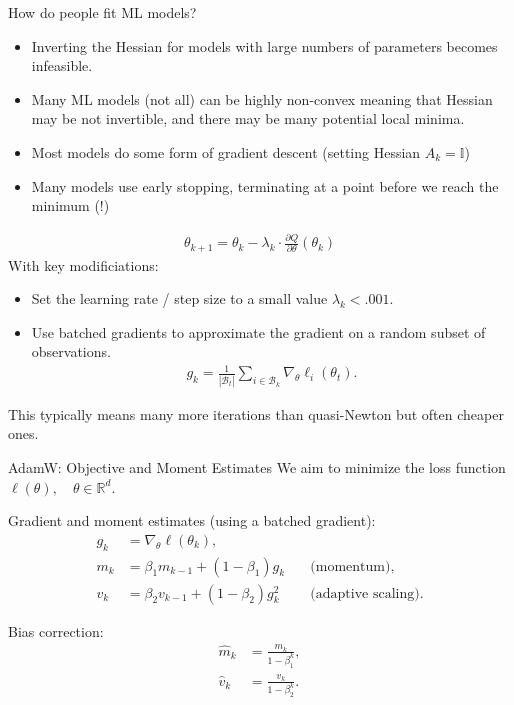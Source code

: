 \documentclass[aspectratio=169,11pt]{beamer}
\begin{document}
\begin{frame}{How do people fit ML models?}
\begin{itemize}
	\item Inverting the Hessian for models with large numbers of parameters becomes infeasible.
	\item Many ML models (not all) can be highly \alert{non-convex} meaning that Hessian may be not invertible, and there may be many potential \alert{local minima}.
	\item Most models do some form of \alert{gradient descent} (setting Hessian $A_k=\mathbb{I}$)
	\item Many models use \alert{early stopping}, terminating at a point before we reach the minimum (!)
\end{itemize}
\begin{align*}
\theta_{k+1} = \theta_k - \lambda_k \cdot \frac{\partial Q}{\partial \theta}(\theta_k)
\end{align*}
With key modificiations:
\begin{itemize}
	\item Set the \alert{learning rate / step size} to a small value $\lambda_k < .001$.
	\item Use \alert{batched gradients} to approximate the gradient on a random subset of observations.
	\begin{align*}
	g_k=\frac{1}{\left|\mathcal{B}_t\right|} \sum_{i \in \mathcal{B}_k} \nabla_\theta \ell_i\left(\theta_t\right) .
	\end{align*}
\end{itemize}
This typically means many more iterations than quasi-Newton but often cheaper ones.
\end{frame}

\begin{frame}{AdamW: Objective and Moment Estimates}
We aim to minimize the loss function $\ell(\theta), \quad \theta \in \mathbb{R}^d$.

Gradient and moment estimates (using a batched gradient):
\begin{align}
    g_k &= \nabla_\theta \ell(\theta_k), \\
    m_k &= \beta_1 m_{k-1} + (1 - \beta_1) g_k \quad &\text{(momentum)}, \\
    v_k &= \beta_2 v_{k-1} + (1 - \beta_2) g_k^2 \quad &\text{(adaptive scaling)}.
\end{align}

Bias correction:
\begin{align}
    \hat{m}_k &= \frac{m_k}{1 - \beta_1^k}, \\
    \hat{v}_k &= \frac{v_k}{1 - \beta_2^k}.
\end{align}

\end{frame}
\end{document}
